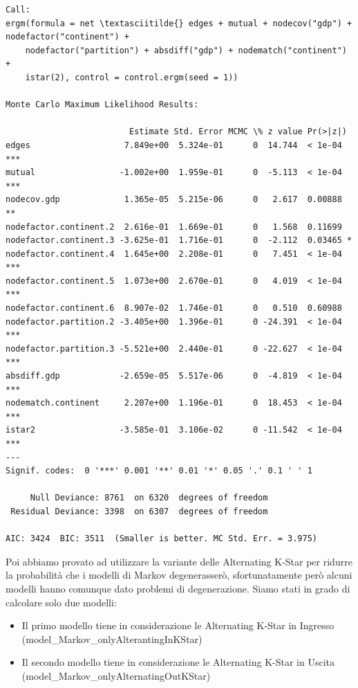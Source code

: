 \documentclass[11pt]{article}
\providecommand{\tightlist}{%
      \setlength{\itemsep}{0pt}\setlength{\parskip}{0pt}}
\begin{document}
    
    \begin{Verbatim}[commandchars=\\\{\}]
Call:
ergm(formula = net \textasciitilde{} edges + mutual + nodecov("gdp") + nodefactor("continent") + 
    nodefactor("partition") + absdiff("gdp") + nodematch("continent") + 
    istar(2), control = control.ergm(seed = 1))

Monte Carlo Maximum Likelihood Results:

                         Estimate Std. Error MCMC \% z value Pr(>|z|)    
edges                   7.849e+00  5.324e-01      0  14.744  < 1e-04 ***
mutual                 -1.002e+00  1.959e-01      0  -5.113  < 1e-04 ***
nodecov.gdp             1.365e-05  5.215e-06      0   2.617  0.00888 ** 
nodefactor.continent.2  2.616e-01  1.669e-01      0   1.568  0.11699    
nodefactor.continent.3 -3.625e-01  1.716e-01      0  -2.112  0.03465 *  
nodefactor.continent.4  1.645e+00  2.208e-01      0   7.451  < 1e-04 ***
nodefactor.continent.5  1.073e+00  2.670e-01      0   4.019  < 1e-04 ***
nodefactor.continent.6  8.907e-02  1.746e-01      0   0.510  0.60988    
nodefactor.partition.2 -3.405e+00  1.396e-01      0 -24.391  < 1e-04 ***
nodefactor.partition.3 -5.521e+00  2.440e-01      0 -22.627  < 1e-04 ***
absdiff.gdp            -2.659e-05  5.517e-06      0  -4.819  < 1e-04 ***
nodematch.continent     2.207e+00  1.196e-01      0  18.453  < 1e-04 ***
istar2                 -3.585e-01  3.106e-02      0 -11.542  < 1e-04 ***
---
Signif. codes:  0 '***' 0.001 '**' 0.01 '*' 0.05 '.' 0.1 ' ' 1

     Null Deviance: 8761  on 6320  degrees of freedom
 Residual Deviance: 3398  on 6307  degrees of freedom
 
AIC: 3424  BIC: 3511  (Smaller is better. MC Std. Err. = 3.975)
    \end{Verbatim}

    
    Poi abbiamo provato ad utilizzare la variante delle Alternating K-Star
per ridurre la probabilità che i modelli di Markov degenerasserò,
sfortunatamente però alcuni modelli hanno comunque dato problemi di
degenerazione. Siamo stati in grado di calcolare solo due modelli:

\begin{itemize}
\tightlist
\item
  Il primo modello tiene in considerazione le Alternating K-Star in
  Ingresso (model\_Markov\_onlyAlterantingInKStar)
\item
  Il secondo modello tiene in considerazione le Alternating K-Star in
  Uscita (model\_Markov\_onlyAlternatingOutKStar)
\end{itemize}
\end{document}

